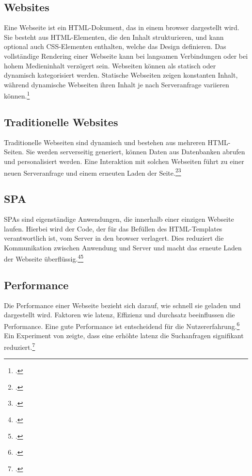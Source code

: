 \subsection{Websites}
Eine Webseite ist ein \ac{HTML}-Dokument, das in einem \gls{browser} dargestellt wird.
Sie besteht aus \ac{HTML}-Elementen, die den Inhalt strukturieren, und kann optional auch \ac{CSS}-Elementen enthalten, welche das Design definieren.
Das vollständige Rendering einer Webseite kann bei langsamen Verbindungen oder bei hohem Medieninhalt verzögert sein.
Webseiten können als statisch oder dynamisch kategorisiert werden.
Statische Webseiten zeigen konstanten Inhalt, während dynamische Webseiten ihren Inhalt je nach Serveranfrage variieren können.\footcite[Vgl.][Seite 25 - 31]{Robbins2018}

\subsection{Traditionelle Websites}
Traditionelle Webseiten sind dynamisch und bestehen aus mehreren \ac{HTML}-Seiten.
Sie werden serverseitig generiert, können Daten aus Datenbanken abrufen und personalisiert werden.
Eine Interaktion mit solchen Webseiten führt zu einer neuen Serveranfrage und einem erneuten Laden der Seite.\footcite[Vgl.][Seite 32]{Robbins2018}\footcite[Vgl.][Seite 5]{Scott2015}

\subsection{\ac{SPA}}
\ac{SPA}s sind eigenständige Anwendungen, die innerhalb einer einzigen Webseite laufen.
Hierbei wird der Code, der für das Befüllen des \ac{HTML}-Templates verantwortlich ist, vom Server in den \gls{browser} verlagert.
Dies reduziert die Kommunikation zwischen Anwendung und Server und macht das erneute Laden der Webseite überflüssig.\footcite[Vgl.][Seite 14]{Flanagan2011}\footcite[Vgl.][Seite 23]{Doguhan2020}

\subsection{Performance}
Die Performance einer Webseite bezieht sich darauf, wie schnell sie geladen und dargestellt wird.
Faktoren wie \gls{latenz}, Effizienz und \gls{durchsatz} beeinflussen die Performance.
Eine gute Performance ist entscheidend für die Nutzererfahrung.\footcite[Vgl.][Seite 53]{Killelea2002}
Ein Experiment von  zeigte, dass eine erhöhte \gls{latenz} die Suchanfragen signifikant reduziert.\footcite[Vgl.][Seite 1]{Google2009}

